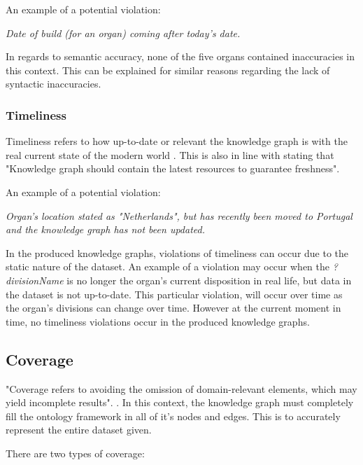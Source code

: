 \noindent An example of a potential violation: 
\begin{displayquote}
    \textit{Date of build (for an organ) coming after today's date.}
\end{displayquote}

In regards to semantic accuracy, none of the five organs contained inaccuracies in this context. This can be explained for similar reasons regarding the lack of syntactic inaccuracies. 

\subsubsection{Timeliness}
\hspace{0.5cm} Timeliness refers to how up-to-date or relevant the knowledge graph is with the real current state of the modern world \cite{knowledgegraphevaulationbook}. This is also in line with \cite{evaluationpaper} stating that "Knowledge graph should contain the latest resources to guarantee freshness".

\noindent An example of a potential violation:
\begin{displayquote}
    \textit{Organ's location stated as "Netherlands", but has recently been moved to Portugal and the knowledge graph has not been updated.}
\end{displayquote}

In the produced knowledge graphs, violations of timeliness can occur due to the static nature of the dataset. An example of a violation may occur when the \textit{?divisionName} is no longer the organ's current disposition in real life, but data in the dataset is not up-to-date. This particular violation, will occur over time as the organ's divisions can change over time. However at the current moment in time, no timeliness violations occur in the produced knowledge graphs.

\subsection{Coverage}
\hspace{0.5cm} "Coverage refers to avoiding the omission of domain-relevant elements, which may yield incomplete results". \cite{knowledgegraphevaulationbook}. In this context, the knowledge graph must completely fill the ontology framework in all of it's nodes and edges. This is to accurately represent the entire dataset given. 

\noindent There are two types of coverage: 

